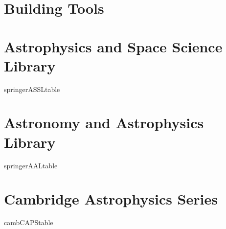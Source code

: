 \documentclass{book}
\begin{document}
\section{Building Tools}


\newpage
\appendixpage
\begin{appendix}

  \section{Astrophysics and Space Science Library}
  {springerASSLtable}

  \newpage
  \section{Astronomy and Astrophysics Library}
  {springerAALtable}

  \newpage
  \section{Cambridge Astrophysics Series}
  {cambCAPStable}

\end{appendix}

\printbibliography
\end{document}
